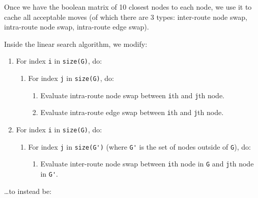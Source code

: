 \documentclass[14pt]{article}
\begin{document}
Once we have the boolean matrix of 10 closest nodes to each node, we use it to
cache all acceptable moves (of which there are 3 types: inter-route node swap,
intra-route node swap, intra-route edge swap).

\noindent
Inside the linear search algorithm, we modify:
\begin{enumerate}
	\item For index \verb`i` in \verb`size(G)`, do:
		\begin{enumerate}
			\item For index \verb`j` in \verb`size(G)`, do:
				\begin{enumerate}
					\item Evaluate intra-route node swap between \verb`i`th and
						\verb`j`th node.
					\item Evaluate intra-route edge swap between \verb`i`th and
						\verb`j`th node.
				\end{enumerate}
		\end{enumerate}
	\item For index \verb`i` in \verb`size(G)`, do:
		\begin{enumerate}
			\item For index \verb`j` in \verb`size(G')` (where \verb`G'` is the set of nodes outside of \verb`G`), do:
				\begin{enumerate}
					\item Evaluate inter-route node swap between \verb`i`th
						node in \verb`G` and \verb`j`th node in \verb`G'`.
				\end{enumerate}
		\end{enumerate}
\end{enumerate}
\ldots to instead be:
\end{document}
